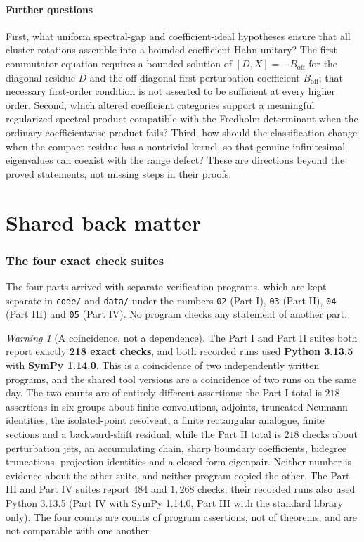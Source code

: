\documentclass[11pt,a4paper]{article}
\numberwithin{equation}{section}
\theoremstyle{definition}
\theoremstyle{remark}
\newtheorem{warning}[warning]{Warning}
\begin{document}
\subsection{Further questions}\label{ihs:fr:sec:questions}
First, what uniform spectral-gap and coefficient-ideal hypotheses ensure that
all cluster rotations assemble into a bounded-coefficient Hahn unitary? The
first commutator equation requires a bounded solution of
$[D,X]=-B_{\mathrm{off}}$ for the diagonal residue $D$ and the off-diagonal
first perturbation coefficient $B_{\mathrm{off}}$; that necessary first-order
condition is not asserted to be sufficient at every higher order. Second,
which altered coefficient categories support a meaningful regularized
spectral product compatible with the Fredholm determinant when the ordinary
coefficientwise product fails? Third, how should the classification change
when the compact residue has a nontrivial kernel, so that genuine
infinitesimal eigenvalues can coexist with the range defect? These are
directions beyond the proved statements, not missing steps in their proofs.

\clearpage
\part*{Shared back matter}

\section{The four exact check suites}\label{ihs:sec:checks}

The four parts arrived with separate verification programs, which are kept
separate in \texttt{code/} and \texttt{data/} under the numbers \texttt{02}
(Part I), \texttt{03} (Part II), \texttt{04} (Part III) and \texttt{05}
(Part IV). No program checks any statement of another part.

\begin{warning}[A coincidence, not a dependence]\label{ihs:warn:coincidence}
The Part I and Part II suites both report exactly \textbf{218 exact checks},
and both recorded runs used \textbf{Python 3.13.5} with \textbf{SymPy 1.14.0}.
This is a coincidence of two independently written programs, and the shared
tool versions are a coincidence of two runs on the same day. The two counts
are of entirely different assertions: the Part I total is
$218$ assertions in six groups about finite convolutions, adjoints,
truncated Neumann identities, the isolated-point resolvent, a finite
rectangular analogue, finite sections and a backward-shift residual, while
the Part II total is $218$ checks about perturbation jets, an accumulating
chain, sharp boundary coefficients, bidegree truncations, projection
identities and a closed-form eigenpair. Neither number is evidence about the
other suite, and neither program copied the other. The Part III and Part IV
suites report $484$ and $1{,}268$ checks; their recorded runs also used
Python 3.13.5 (Part IV with SymPy 1.14.0, Part III with the standard library
only). The four counts are counts of program assertions, not of theorems, and
are not comparable with one another.
\end{warning}
\end{document}
